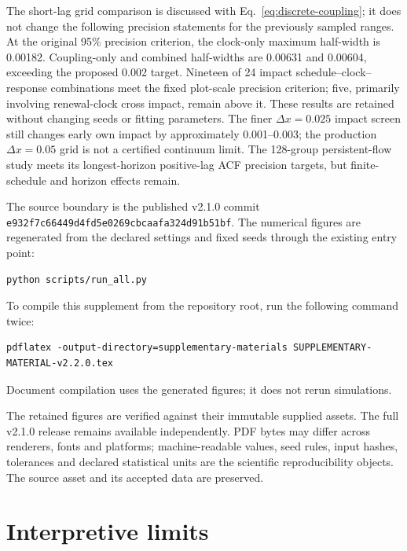 \documentclass[11pt]{article}
\begin{document}
The short-lag grid comparison is discussed with Eq.~\eqref{eq:discrete-coupling}; it does not change the following precision statements for the previously sampled ranges. At the original 95\% precision criterion, the clock-only maximum half-width is 0.00182. Coupling-only and combined half-widths are 0.00631 and 0.00604, exceeding the proposed 0.002 target. Nineteen of 24 impact schedule--clock--response combinations meet the fixed plot-scale precision criterion; five, primarily involving renewal-clock cross impact, remain above it. These results are retained without changing seeds or fitting parameters. The finer $\Delta x=0.025$ impact screen still changes early own impact by approximately 0.001--0.003; the production $\Delta x=0.05$ grid is not a certified continuum limit. The 128-group persistent-flow study meets its longest-horizon positive-lag ACF precision targets, but finite-schedule and horizon effects remain.

The source boundary is the published v2.1.0 commit
\texttt{e932f7c66449d4fd5e0269cbcaafa324d91b51bf}.
The numerical figures are regenerated from the declared settings and fixed seeds through the existing entry point:
\begin{verbatim}
python scripts/run_all.py
\end{verbatim}
To compile this supplement from the repository root, run the following command twice:
{\small
\begin{verbatim}
pdflatex -output-directory=supplementary-materials SUPPLEMENTARY-MATERIAL-v2.2.0.tex
\end{verbatim}
}
Document compilation uses the generated figures; it does not rerun simulations.

The retained figures are verified against their immutable supplied assets. The full v2.1.0 release remains available independently. PDF bytes may differ across renderers, fonts and platforms; machine-readable values, seed rules, input hashes, tolerances and declared statistical units are the scientific reproducibility objects. The source asset and its accepted data are preserved.

\section{Interpretive limits}
\end{document}
